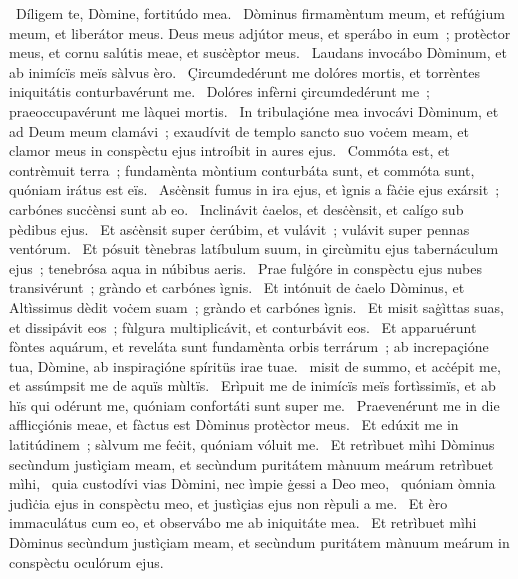 \psalmChapterWithInscription{}
{ }
{%
~Díligem te, Dòmine, fortitúdo mea. 
~Dòminus firmamèntum meum, et refúġium meum, et liberátor meus. Deus meus adjútor meus, et sperábo in eum~; protèctor meus, et cornu salútis meae, et susċèptor meus. 
~Laudans invocábo Dòminum, et ab inimícïs meïs sàlvus èro. 
~Çircumdedérunt me dolóres mortis, et torrèntes iniquitátis conturbavérunt me. 
~Dolóres infèrni çircumdedérunt me~; praeoccupavérunt me làquei mortis. 
~In tribulaçióne mea invocávi Dòminum, et ad Deum meum clamávi~; exaudívit de templo sancto suo voċem meam, et clamor meus in conspèctu ejus introíbit in aures ejus. 
~Commóta est, et contrèmuit terra~; fundamènta mòntium conturbáta sunt, et commóta sunt, quóniam irátus est eïs. 
~Asċènsit fumus in ira ejus, et ìgnis a fàċie ejus exársit~; carbónes sucċènsi sunt ab eo. 
~Inclinávit ċaelos, et desċènsit, et calígo sub pèdibus ejus. 
~Et asċènsit super ċerúbim, et vulávit~; vulávit super pennas ventórum. 
~Et pósuit tènebras latíbulum suum, in çircùmitu ejus tabernáculum ejus~; tenebrósa aqua in núbibus aeris. 
~Prae fulġóre in conspèctu ejus nubes transivérunt~; gràndo et carbónes ìgnis. 
~Et intónuit de ċaelo Dòminus, et Altìssimus dèdit voċem suam~; gràndo et carbónes ìgnis. 
~Et misit saġìttas suas, et dissipávit eos~; fùlgura multiplicávit, et conturbávit eos. 
~Et apparuérunt fòntes aquárum, et reveláta sunt fundamènta orbis terrárum~; ab increpaçióne tua, Dòmine, ab inspiraçióne spíritüs irae tuae. 
~misit de summo, et acċépit me, et assúmpsit me de aquïs mùltïs. 
~Erìpuit me de inimícïs meïs fortìssimïs, et ab hïs qui odérunt me, quóniam confortáti sunt super me. 
~Praevenérunt me in die afflicçiónis meae, et fàctus est Dòminus protèctor meus. 
~Et edúxit me in latitúdinem~; sàlvum me feċit, quóniam vóluit me. 
~Et retrìbuet mìhi Dòminus secùndum justìçiam meam, et secùndum puritátem mànuum meárum retrìbuet mìhi, 
~quia custodívi vias Dòmini, nec ìmpie ġessi a Deo meo, 
~quóniam òmnia judìċia ejus in conspèctu meo, et justìçias ejus non rèpuli a me. 
~Et èro immaculátus cum eo, et observábo me ab iniquitáte mea. 
~Et retrìbuet mìhi Dòminus secùndum justìçiam meam, et secùndum puritátem mànuum meárum in conspèctu oculórum ejus. 
}
